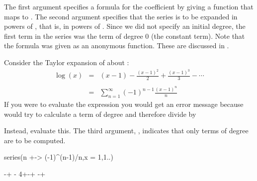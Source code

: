 {{{{{{{{{{{{{{{The first argument specifies a formula for the 
coefficient by giving a function that maps  to
.
The second argument specifies that the series is to be expanded in
powers of , that is, in powers of .
Since we did not specify an initial degree, the first term in the
series was the term of degree 0 (the constant term).
Note that the formula was given as an anonymous function.
These are discussed in .

Consider the Taylor expansion of  about :
\begin{displaymath}
\begin{array}{ccl}
\log(x) &=& \displaystyle (x - 1) - \frac{(x - 1)^2}{2} + \frac{(x - 1)^3}{3} - \cdots \\ \\
        &=& \displaystyle\sum_{n = 1}^\infty (-1)^{n-1} \frac{(x - 1)^n}{n}
\end{array}
\end{displaymath}
If you were to evaluate the expression
you would get an error message because \Language{} would try to
calculate a term of degree  and therefore divide by 

\begin{xtc}
\begin{xtccomment}
Instead, evaluate this.
The third argument, , indicates that only terms of degree
 are to be computed.
\end{xtccomment}
\begin{spadsrc}
series(n +-> (-1)^(n-1)/n,x = 1,1..)
\end{spadsrc}
\begin{TeXOutput}
\begin{fricasmath}{2}
-{\TIMES {}}+%
\TIMES {}-{\TIMES \SUPER%
{}{4}}+\TIMES {}-{\TIMES {}}+\TIMES %
-{\TIMES {}}+%
\end{fricasmath}
\end{TeXOutput}
\end{xtc}
%

}}}}}}}}}}}}}}}
